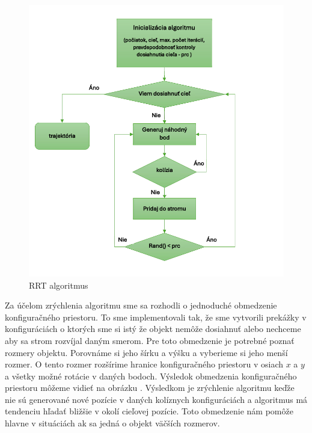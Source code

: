  \begin{figure}[h!]
	\centering
	\includegraphics[width=140mm]{img/VD_RRT.png}
	\caption{RRT algoritmus} \label{OBRAZOK 4.16} 
\end{figure}

 
 Za účelom zrýchlenia algoritmu sme sa rozhodli o jednoduché obmedzenie konfiguračného priestoru. To sme implementovali tak, že sme vytvorili prekážky v konfiguráciách o ktorých sme si istý že objekt nemôže dosiahnuť alebo nechceme aby sa strom rozvíjal daným smerom. Pre toto obmedzenie je potrebné poznať rozmery objektu. Porovnáme si jeho šírku a výšku a vyberieme si jeho menší rozmer. O tento rozmer rozšírime hranice konfiguračného priestoru v osiach $ x $ a $ y $ a všetky možné rotácie v daných bodoch. Výsledok obmedzenia konfiguračného priestoru môžeme vidieť na obrázku . Výsledkom je zrýchlenie algoritmu keďže nie sú generované nové pozície v daných kolíznych konfiguráciách a algoritmus má tendenciu hľadať bližšie v okolí cieľovej pozície. Toto obmedzenie nám pomôže hlavne v situáciách ak sa jedná o objekt väčších rozmerov. 
 
